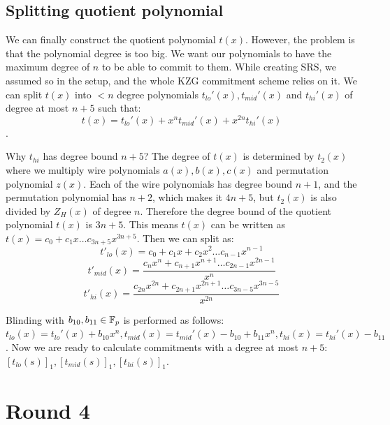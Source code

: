 \subsection{Splitting quotient polynomial}
\label{sec:polynomial-splitting}

We can finally construct the quotient polynomial $t(x)$. However, the problem is that the polynomial degree is too big. We want our polynomials to have the maximum degree of $n$ to be able to commit to them. While creating SRS, we assumed so in the setup, and the whole KZG commitment scheme relies on it. We can split $t(x)$ into $< n$ degree polynomials $t_{lo}'(x), t_{mid}'(x)$ and $t_{hi}'(x)$ of degree at most $n+5$ such that: $$t(x) = t_{lo}'(x) + x^nt_{mid}'(x) + x^{2n}t_{hi}'(x)$$.

Why $t_{hi}$ has degree bound $n+5$? The degree of $t(x)$ is determined by $t_2(x)$ where we multiply wire polynomials $a(x), b(x), c(x)$ and permutation polynomial $z(x)$. Each of the wire polynomials has degree bound $n+1$, and the permutation polynomial has $n+2$, which makes it $4n+5$, but $t_2(x)$ is also divided by $Z_H(x)$ of degree $n$. Therefore the degree bound of the quotient polynomial $t(x)$ is $3n+5$. This means $t(x)$ can be written as $t(x) = c_0 + c_1x \ldots c_{3n+5}x^{3n+5}$. Then we can split as:
$$t'_{lo}(x) = c_0 + c_1 x + c_2 x^2 \ldots c_{n-1}x^{n-1}$$
$$t'_{mid}(x) = \frac{c_{n}x^{n} + c_{n+1}x^{n+1} \ldots c_{2n-1}x^{2n-1}}{x^n}$$
$$t'_{hi}(x) = \frac{c_{2n}x^{2n} + c_{2n+1}x^{2n+1} \ldots c_{3n-5}x^{3n-5}}{x^{2n}}$$

Blinding with $b_{10}, b_{11} \in \mathbb{F}_p$ is performed as follows: $t_{lo}(x) = t_{lo}'(x) + b_{10}x^n , t_{mid}(x) = t_{mid}'(x) - b_{10} + b_{11}x^n, t_{hi}(x) = t_{hi}'(x) - b_{11}$. Now we are ready to calculate commitments with a degree at most $n+5$: $[t_{lo}(s)]_1, [t_{mid}(s)]_1, [t_{hi}(s)]_1$.


\section{Round 4}
\label{chap:round4}

